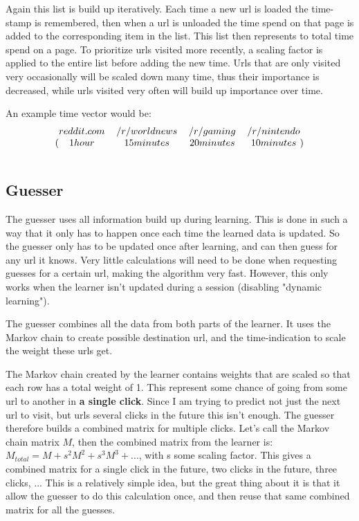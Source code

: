 \documentclass{article}
\begin{document}
Again this list is build up iteratively.
Each time a new url is loaded the time-stamp is remembered, then when a url is unloaded the time spend on that page is added to the corresponding item in the list.
This list then represents to total time spend on a page.
To prioritize urls visited more recently, a scaling factor is applied to the entire list before adding the new time.
Urls that are only visited very occasionally will be scaled down many time, thus their importance is decreased, while urls visited very often will build up importance over time.

An example time vector would be:
\[
\begin{blockarray}{cccc}
reddit.com & /r/worldnews & /r/gaming & /r/nintendo \\
\begin{block}{(cccc)}
    1 hour & 15 minutes & 20 minutes & 10 minutes \\
\end{block}
\end{blockarray}
\]

\subsection{Guesser}

The guesser uses all information build up during learning.
This is done in such a way that it only has to happen once each time the learned data is updated.
So the guesser only has to be updated once after learning, and can then guess for any url it knows.
Very little calculations will need to be done when requesting guesses for a certain url, making the algorithm very fast.
However, this only works when the learner isn't updated during a session (disabling "dynamic learning").

The guesser combines all the data from both parts of the learner.
It uses the Markov chain to create possible destination url, and the time-indication to scale the weight these urls get.

The Markov chain created by the learner contains weights that are scaled so that each row has a total weight of 1.
This represent some chance of going from some url to another in \textbf{a single click}.
Since I am trying to predict not just the next url to visit, but urls several clicks in the future this isn't enough.
The guesser therefore builds a combined matrix for multiple clicks.
Let's call the Markov chain matrix $M$, then the combined matrix from the learner is: $M_{total} = M + s^2 M^2 + s^3 M^3 + ...$, with s some scaling factor.
This gives a combined matrix for a single click in the future, two clicks in the future, three clicks, ...
This is a relatively simple idea, but the great thing about it is that it allow the guesser to do this calculation once, and then reuse that same combined matrix for all the guesses.
\end{document}
